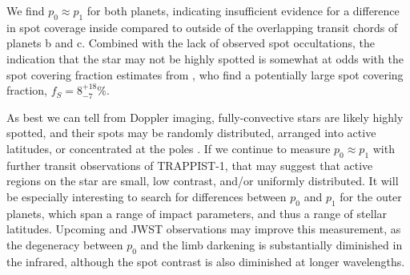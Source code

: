 We find $p_0 \approx p_1$ for both planets, indicating insufficient evidence for a difference in spot coverage inside compared to outside of the overlapping transit chords of planets b and c. Combined with the lack of observed spot occultations, the indication that the star may not be highly spotted is somewhat at odds with the spot covering fraction estimates from \citet{Rackham2018, Zhang2018}, who find a potentially large spot covering fraction, $f_S = 8^{+18}_{-7} \%$.  

As best we can tell from Doppler imaging, fully-convective stars are likely highly spotted, and their spots may be randomly distributed, arranged into active latitudes, or concentrated at the poles \citep{Barnes2001,Donati2003,Morin2008}. If we continue to measure $p_0 \approx p_1$ with further transit observations of TRAPPIST-1, that may suggest that active regions on the star are small,  low contrast, and/or uniformly distributed. It will be especially interesting to search for differences between $p_0$ and $p_1$ for the outer planets, which span a range of impact parameters, and thus a range of stellar latitudes. Upcoming \spitzer and JWST observations may improve this measurement, as the degeneracy between $p_0$ and the limb darkening is substantially diminished in the infrared, although the spot contrast is also diminished at longer wavelengths.

